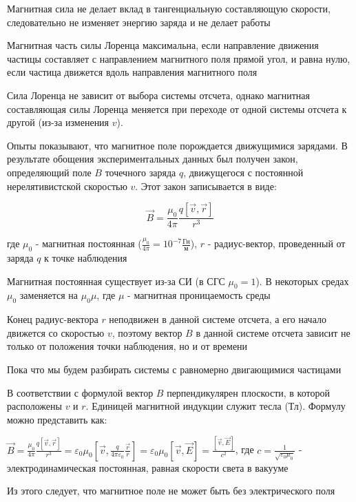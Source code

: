 \documentclass[12pt]{article}
\begin{document}
Магнитная сила не делает вклад в тангенциальную составляющую скорости, следовательно не изменяет энергию заряда и не делает работы

Магнитная часть силы Лоренца максимальна, если направление движения частицы составляет с направлением магнитного поля 
прямой угол, и равна нулю, если частица движется вдоль направления магнитного поля

Сила Лоренца не зависит от выбора системы отсчета, однако магнитная составляющая силы Лоренца меняется при переходе от одной
системы отсчета к другой (из-за изменения $v$).

Опыты показывают, что магнитное поле порождается движущимися зарядами. В результате обощения экспериментальных данных
был получен закон, определяющий поле $B$ точечного заряда $q$, движущегося с постоянной нерелятивистской скоростью $v$. 
Этот закон записывается в виде:

\[\vec{B} = \frac{\mu_0}{4\pi} \frac{q [\vec{v}, \vec{r}]}{r^3}\]

где $\mu_0$ - магнитная постоянная ($\frac{\mu_0}{4\pi} = 10^{-7} \frac{\text{Гн}}{\text{м}}$), $r$ - радиус-вектор, проведенный от заряда $q$ к точке наблюдения

Магнитная постоянная существует из-за СИ (в СГС $\mu_0 = 1$). В некоторых средах $\mu_0$ заменяется на $\mu_0 \mu$, где $\mu$ - магнитная проницаемость среды

\mediumvspace

Конец радиус-вектора $r$ неподвижен в данной системе отсчета, а его начало движется со скоростью $v$, поэтому
вектор $B$ в данной системе отсчета зависит не только от положения точки наблюдения, но и от времени

Пока что мы будем разбирать системы с равномерно двигающимися частицами

В соответствии с формулой вектор $B$ перпендикулярен плоскости, в которой расположены $v$ и $r$.
Единицей магнитной индукции служит тесла (Тл). Формулу можно представить как:

$\vec{B} = \frac{\mu_0}{4\pi} \frac{q [\vec{v}, \vec{r}]}{r^3} = \varepsilon_0 \mu_0 \left[\vec{v}, \frac{q}{4\pi\varepsilon_0} \frac{\vec{r}}{r}\right] = 
\varepsilon_0 \mu_0 [\vec{v}, \vec{E}] = \frac{[\vec{v}, \vec{E}]}{c^2}$, где $c = \frac{1}{\sqrt{\varepsilon_0 \mu_0}}$ - электродинамическая постоянная, равная скорости света в вакууме

Из этого следует, что магнитное поле не может быть без электрического поля

\mediumvspace
\end{document}
